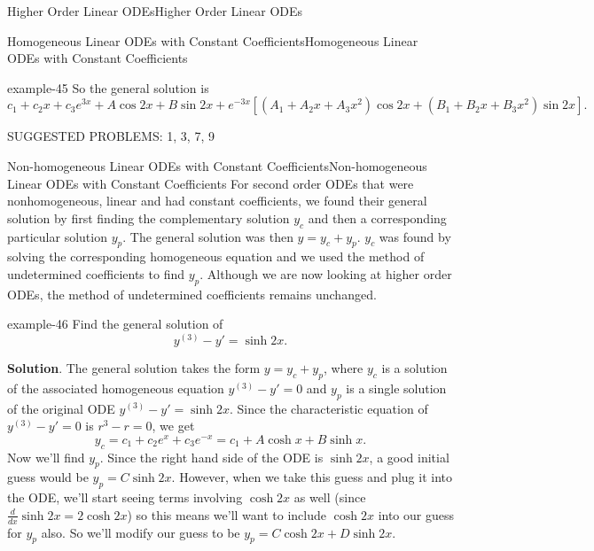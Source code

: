 \documentclass[10pt,]{book}
\numberwithin{equation}{section}
\newcommand{\brackets}[1]{\left[ #1 \right]}
\begin{document}
\begin{chapterptx}{Higher Order Linear ODEs}{}{Higher Order Linear ODEs}{}{}
\begin{sectionptx}{Homogeneous Linear ODEs with Constant Coefficients}{}{Homogeneous Linear ODEs with Constant Coefficients}{}{}
\begin{example}{}{example-45}
\hypertarget{p-281}{}%
So the general solution is%
\begin{equation*}
c_{1}+c_{2}x+c_{3}e^{3x}+A\cos2x+B\sin2x+e^{-3x}\brackets{(A_{1}+A_{2}x+A_{3}x^{2})\cos2x+(B_{1}+B_{2}x+B_{3}x^{2})\sin2x}.
\end{equation*}
%
\end{example}
\begin{conclusion}{}%
\hypertarget{p-282}{}%
SUGGESTED PROBLEMS: 1, 3, 7, 9%
\end{conclusion}%
\end{sectionptx}
%
%
\typeout{************************************************}
\typeout{************************************************}
%
\begin{sectionptx}{Non-homogeneous Linear ODEs with Constant Coefficients}{}{Non-homogeneous Linear ODEs with Constant Coefficients}{}{}\label{section-non-homogeneous-linear-odes-with-constant-coefficients}
\hypertarget{p-283}{}%
For second order ODEs that were nonhomogeneous, linear and had constant coefficients, we found their general solution by first finding the complementary solution \(y_{c}\) and then a corresponding particular solution \(y_{p}\). The general solution was then \(y=y_{c}+y_{p}\). \(y_{c}\) was found by solving the corresponding homogeneous equation and we used the method of undetermined coefficients to find \(y_{p}\). Although we are now looking at higher order ODEs, the method of undetermined coefficients remains unchanged.%
\begin{example}{}{example-46}%
\hypertarget{p-284}{}%
Find the general solution of%
\begin{equation*}
y^{(3)}-y' = \sinh 2x.
\end{equation*}
%
\par\smallskip%
\noindent\textbf{Solution}.\hypertarget{solution-43}{}\quad%
\hypertarget{p-285}{}%
The general solution takes the form \(y = y_{c}+y_{p}\), where \(y_{c}\) is a solution of the associated homogeneous equation \(y^{(3)}-y'=0\) and \(y_{p}\) is a single solution of the original ODE \(y^{(3)}-y'=\sinh 2x\). Since the characteristic equation of \(y^{(3)}-y'=0\) is \(r^{3}-r=0\), we get%
\begin{equation*}
y_{c} = c_{1}+c_{2}e^{x}+c_{3}e^{-x} = c_{1}+A\cosh x+B\sinh x.
\end{equation*}
Now we'll find \(y_{p}\). Since the right hand side of the ODE is \(\sinh 2x\), a good initial guess would be \(y_{p} = C\sinh 2x\). However, when we take this guess and plug it into the ODE, we'll start seeing terms involving \(\cosh 2x\) as well (since \(\frac{d}{dx}\sinh 2x = 2\cosh 2x\)) so this means we'll want to include \(\cosh 2x\) into our guess for \(y_{p}\) also. So we'll modify our guess to be \(y_{p} = C\cosh 2x+D\sinh 2x\).%

\end{example}
\end{sectionptx}
\end{chapterptx}
\end{document}
